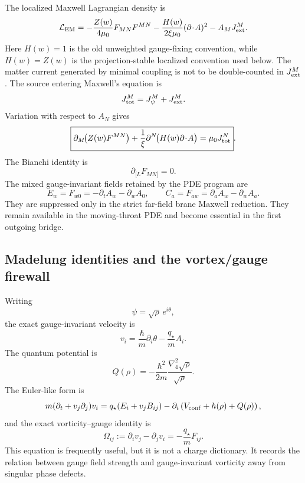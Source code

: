 The localized Maxwell Lagrangian density is
\begin{equation}
\label{eq:part01-LEM}
\mathcal L_{\rm EM}
=
-\frac{Z(w)}{4\mu_0}F_{MN}F^{MN}
-\frac{H(w)}{2\xi\mu_0}(\partial\!\cdot\!A)^2
-A_MJ_{\rm ext}^M.
\end{equation}
Here \(H(w)=1\) is the old unweighted gauge-fixing convention, while
\(H(w)=Z(w)\) is the projection-stable localized convention used below.
The matter current generated by minimal coupling is not to be double-counted in \(J_{\rm ext}^M\).  The source entering Maxwell's equation is
\begin{equation}
J_{\rm tot}^M=J_\psi^M+J_{\rm ext}^M.
\end{equation}
Variation with respect to \(A_N\) gives
\begin{equation}
\label{eq:part01-maxwell-equation}
\boxed{
\partial_M\!\bigl(Z(w)F^{MN}\bigr)
+\frac1\xi\partial^N\!\bigl(H(w)\partial\!\cdot\!A\bigr)
=
\mu_0J_{\rm tot}^N}.
\end{equation}
The Bianchi identity is
\begin{equation}
\partial_{[L}F_{MN]}=0.
\end{equation}
The mixed gauge-invariant fields retained by the PDE program are
\begin{equation}
\label{eq:part01-mixed-fields}
\boxed{
E_w=F_{w0}=-\partial_tA_w-\partial_wA_0,
\qquad
C_a=F_{aw}=\partial_aA_w-\partial_wA_a}.
\end{equation}
They are suppressed only in the strict far-field brane Maxwell reduction.  They remain available in the moving-throat PDE and become essential in the first outgoing bridge.

\subsection{Madelung identities and the vortex/gauge firewall}
\label{subsec:part01-madelung-import}

Writing
\begin{equation}
\psi=\sqrt\rho\,e^{i\theta},
\end{equation}
the exact gauge-invariant velocity is
\begin{equation}
\label{eq:part01-madelung-velocity}
v_i=\frac{\hbar}{m}\partial_i\theta-\frac{q_\star}{m}A_i.
\end{equation}
The quantum potential is
\begin{equation}
Q(\rho)=-\frac{\hbar^2}{2m}\frac{\nabla_4^2\sqrt\rho}{\sqrt\rho}.
\end{equation}
The Euler-like form is
\begin{equation}
\label{eq:part01-euler-form}
m(\partial_t+v_j\partial_j)v_i
=
q_\star(E_i+v_jB_{ij})
-\partial_i\left(V_{\rm conf}+h(\rho)+Q(\rho)\right),
\end{equation}
and the exact vorticity--gauge identity is
\begin{equation}
\label{eq:part01-vorticity-gauge}
\boxed{
\Omega_{ij}:=\partial_i v_j-\partial_jv_i=-\frac{q_\star}{m}F_{ij}}.
\end{equation}
This equation is frequently useful, but it is not a charge dictionary.  It records the relation between gauge field strength and gauge-invariant vorticity away from singular phase defects.

